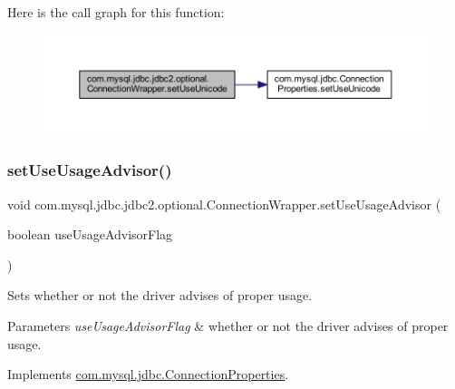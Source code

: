 Here is the call graph for this function\+:
\nopagebreak
\begin{figure}[H]
\begin{center}
\leavevmode
\includegraphics[width=350pt]{classcom_1_1mysql_1_1jdbc_1_1jdbc2_1_1optional_1_1_connection_wrapper_aad47efde1fa5f5f876ed766cf6b01a43_cgraph}
\end{center}
\end{figure}
\mbox{\label{classcom_1_1mysql_1_1jdbc_1_1jdbc2_1_1optional_1_1_connection_wrapper_a1d58ba31c123593e3f79773f45777674}} 
\subsubsection{\texorpdfstring{set\+Use\+Usage\+Advisor()}{setUseUsageAdvisor()}}
{\footnotesize\ttfamily void com.\+mysql.\+jdbc.\+jdbc2.\+optional.\+Connection\+Wrapper.\+set\+Use\+Usage\+Advisor (\begin{DoxyParamCaption}\item[{boolean}]{use\+Usage\+Advisor\+Flag }\end{DoxyParamCaption})}

Sets whether or not the driver advises of proper usage.


\begin{DoxyParams}{Parameters}
{\em use\+Usage\+Advisor\+Flag} & whether or not the driver advises of proper usage. \\
\hline
\end{DoxyParams}


Implements \mbox{\hyperlink{interfacecom_1_1mysql_1_1jdbc_1_1_connection_properties_a8c6cb2052bdd1e63d3be6d2fcbd3908c}{com.\+mysql.\+jdbc.\+Connection\+Properties}}.

